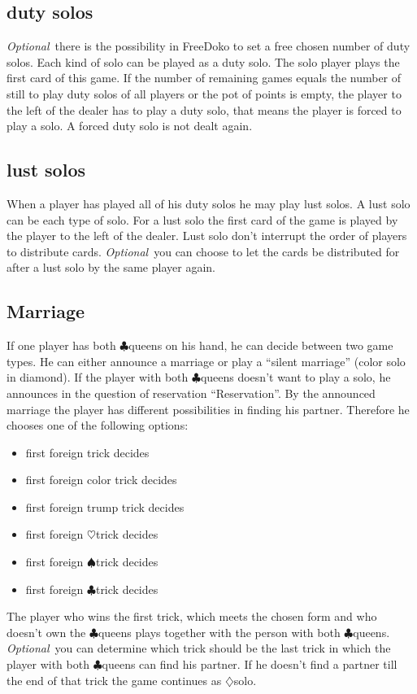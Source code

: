 \documentclass[12pt,a4paper]{article}
\newcommand{\kreuz}{$\clubsuit$}
\newcommand{\pik}{$\spadesuit$}
\newcommand{\herz}{$\heartsuit$}
\newcommand{\karo}{$\diamondsuit$}
\newcommand{\Optional}{\textit{Optional}}
\begin{document}
\subsection{duty solos}
\Optional\ there is the possibility in FreeDoko to set a free
chosen number of duty solos. Each kind of solo can be played as a
duty solo. The solo player plays the first card of this game. If
the number of remaining games equals the number of still to play
duty solos of all players or the pot of points is empty, the
player to the left of the dealer has to play a duty solo, that
means the player is forced to play a solo. A forced duty solo is not dealt again.
\subsection{lust solos}
When a player has played all of his duty solos he may play lust
solos. A lust solo can be each type of solo. For a lust solo the
first card of the game is played by the player to the left of the
dealer. Lust solo don't interrupt the order of players to
distribute cards. \Optional\ you can choose to let the cards be
distributed for after a lust solo by the same player again.
\subsection{Marriage} If one player has both \kreuz queens on
his hand, he can decide between two game types. He can either
announce a marriage or play a "`silent marriage"' (color solo in
diamond). If the player with both \kreuz queens doesn't want to
play a solo, he announces in the question of reservation
"`Reservation"'. By the announced marriage the player has
different possibilities in finding his partner. Therefore he
chooses one of the following options:
\begin{itemize}
\item first foreign trick decides
\item first foreign color trick decides
\item first foreign trump trick decides
\item first foreign \herz trick decides
\item first foreign \pik trick decides
\item first foreign \kreuz trick decides
\end{itemize}
The player who wins the first trick, which meets the chosen form
and who doesn't own the \kreuz queens plays together with the
person with both \kreuz queens. \Optional\ you can determine
which trick should be the last trick in which the player with
both \kreuz queens can find his partner. If he doesn't find a
partner till the end of that trick the game continues as \karo solo.
\end{document}
